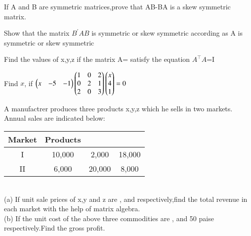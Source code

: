   \item If A and B are symmetric matrices,prove that AB-BA is a skew symmetric matrix.\\
  \item Show that the matrix $ B^{'}AB$ is symmetric or skew symmetric according as A is symmetric or skew symmetric\\
  
  \item Find the values of x,y,z if the matrix A= satisfy the equation $A^{\top}A$=I\\
  \solution
  
  
  \item Find $x$, if $\begin{pmatrix}x &-5 &-1\end{pmatrix}\begin{pmatrix}1 &0 &2\\0 &2 &1\\2 &0 &3\end{pmatrix}\begin{pmatrix}x\\4\\1\end{pmatrix}=0$\\
\solution

  \item A manufactrer produces three products x,y,z which he sells in two markets. Annual sales are indicated below:\\
 
  \begin{tabular}{cccc}
  \hline
  Market & Products\\
  \hline
  I &10,000 &2,000 &18,000\\
  \hline
  II &6,000 &20,000 &8,000\\
  \hline
  \end{tabular}\\
  (a) If unit sale prices of x,y and z are , and  respectively,find the total revenue in each market with the help of matrix algebra.\\
  (b) If the unit cost of the above three commodities are , and 50 paise respectively.Find the gross profit.\\
  \solution
  

